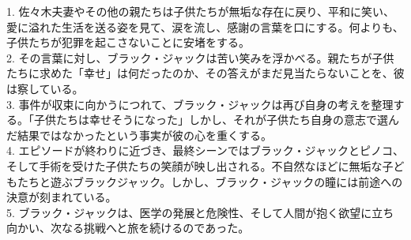 \documentclass[a4j,12pt]{jsreport}
\begin{document}
\begin{breakitembox}
1. 佐々木夫妻やその他の親たちは子供たちが無垢な存在に戻り、平和に笑い、愛に溢れた生活を送る姿を見て、涙を流し、感謝の言葉を口にする。何よりも、子供たちが犯罪を起こさないことに安堵をする。\\
2. その言葉に対し、ブラック・ジャックは苦い笑みを浮かべる。親たちが子供たちに求めた「幸せ」は何だったのか、その答えがまだ見当たらないことを、彼は察している。\\
3.  事件が収束に向かうにつれて、ブラック・ジャックは再び自身の考えを整理する。「子供たちは幸せそうになった」しかし、それが子供たち自身の意志で選んだ結果ではなかったという事実が彼の心を重くする。\\
4. エピソードが終わりに近づき、最終シーンではブラック・ジャックとピノコ、そして手術を受けた子供たちの笑顔が映し出される。不自然なほどに無垢な子どもたちと遊ぶブラックジャック。しかし、ブラック・ジャックの瞳には前途への決意が刻まれている。\\
5. ブラック・ジャックは、医学の発展と危険性、そして人間が抱く欲望に立ち向かい、次なる挑戦へと旅を続けるのであった。

\end{breakitembox}
\end{document}
